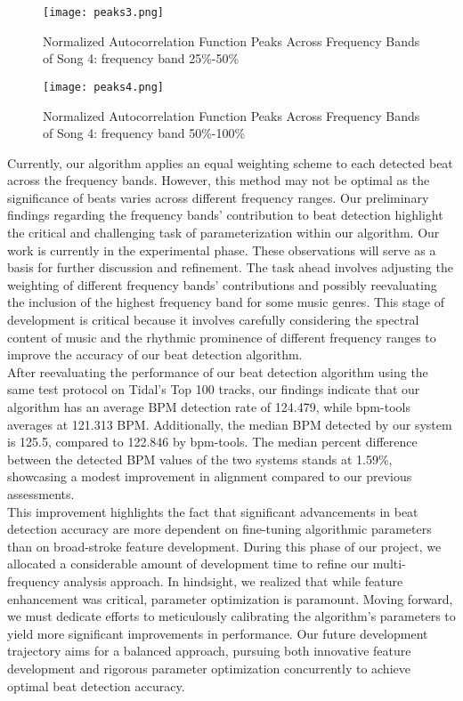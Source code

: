 \begin{figure}[H]
    \centering
    \texttt{[image: peaks3.png]}
    \caption{Normalized Autocorrelation Function Peaks Across Frequency Bands of Song 4: frequency band 25\%-50\%}
\end{figure}

\begin{figure}[H]
    \centering
    \texttt{[image: peaks4.png]}
    \caption{Normalized Autocorrelation Function Peaks Across Frequency Bands of Song 4: frequency band 50\%-100\%}
\end{figure}

Currently, our algorithm applies an equal weighting scheme to each detected beat across the frequency bands. However, this method may not be optimal as the significance of beats varies across different frequency ranges. Our preliminary findings regarding the frequency bands' contribution to beat detection highlight the critical and challenging task of parameterization within our algorithm. Our work is currently in the experimental phase. These observations will serve as a basis for further discussion and refinement. The task ahead involves adjusting the weighting of different frequency bands' contributions and possibly reevaluating the inclusion of the highest frequency band for some music genres. This stage of development is critical because it involves carefully considering the spectral content of music and the rhythmic prominence of different frequency ranges to improve the accuracy of our beat detection algorithm. \\

After reevaluating the performance of our beat detection algorithm using the same test protocol on Tidal's Top 100 tracks, our findings indicate that our algorithm has an average BPM detection rate of 124.479, while bpm-tools averages at 121.313 BPM. Additionally, the median BPM detected by our system is 125.5, compared to 122.846 by bpm-tools. The median percent difference between the detected BPM values of the two systems stands at 1.59\%, showcasing a modest improvement in alignment compared to our previous assessments. \\

This improvement highlights the fact that significant advancements in beat detection accuracy are more dependent on fine-tuning algorithmic parameters than on broad-stroke feature development. During this phase of our project, we allocated a considerable amount of development time to refine our multi-frequency analysis approach. In hindsight, we realized that while feature enhancement was critical, parameter optimization is paramount. Moving forward, we must dedicate efforts to meticulously calibrating the algorithm's parameters to yield more significant improvements in performance. Our future development trajectory aims for a balanced approach, pursuing both innovative feature development and rigorous parameter optimization concurrently to achieve optimal beat detection accuracy.

